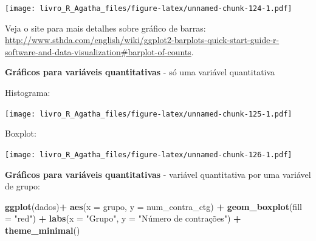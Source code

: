 \documentclass[
]{book}
\newenvironment{Shaded}{\begin{snugshade}}{\end{snugshade}}
\newcommand{\DataTypeTok}[1]{\textcolor[rgb]{0.13,0.29,0.53}{#1}}
\newcommand{\KeywordTok}[1]{\textcolor[rgb]{0.13,0.29,0.53}{\textbf{#1}}}
\newcommand{\NormalTok}[1]{#1}
\newcommand{\OperatorTok}[1]{\textcolor[rgb]{0.81,0.36,0.00}{\textbf{#1}}}
\newcommand{\StringTok}[1]{\textcolor[rgb]{0.31,0.60,0.02}{#1}}
\begin{document}
\texttt{[image: livro\_R\_Agatha\_files/figure-latex/unnamed-chunk-124-1.pdf]}

Veja o site para mais detalhes sobre gráfico de barras:
\url{http://www.sthda.com/english/wiki/ggplot2-barplots-quick-start-guide-r-software-and-data-visualization\#barplot-of-counts}.

\textbf{Gráficos para variáveis quantitativas} - só uma variável quantitativa

Histograma:

\begin{Shaded}
\end{Shaded}

\texttt{[image: livro\_R\_Agatha\_files/figure-latex/unnamed-chunk-125-1.pdf]}

Boxplot:

\begin{Shaded}
\end{Shaded}

\texttt{[image: livro\_R\_Agatha\_files/figure-latex/unnamed-chunk-126-1.pdf]}

\textbf{Gráficos para variáveis quantitativas} - variável quantitativa por uma variável de grupo:

\begin{Shaded}
\begin{Highlighting}[]
\KeywordTok{ggplot}\NormalTok{(dados)}\OperatorTok{+}
\StringTok{  }\KeywordTok{aes}\NormalTok{(}\DataTypeTok{x =}\NormalTok{ grupo, }\DataTypeTok{y =}\NormalTok{ num_contra_ctg) }\OperatorTok{+}
\StringTok{  }\KeywordTok{geom_boxplot}\NormalTok{(}\DataTypeTok{fill =} \StringTok{"red"}\NormalTok{) }\OperatorTok{+}
\StringTok{  }\KeywordTok{labs}\NormalTok{(}\DataTypeTok{x =} \StringTok{"Grupo"}\NormalTok{, }\DataTypeTok{y =} \StringTok{"Número de contrações"}\NormalTok{) }\OperatorTok{+}
\StringTok{  }\KeywordTok{theme_minimal}\NormalTok{()}
\end{Highlighting}
\end{Shaded}
\end{document}
